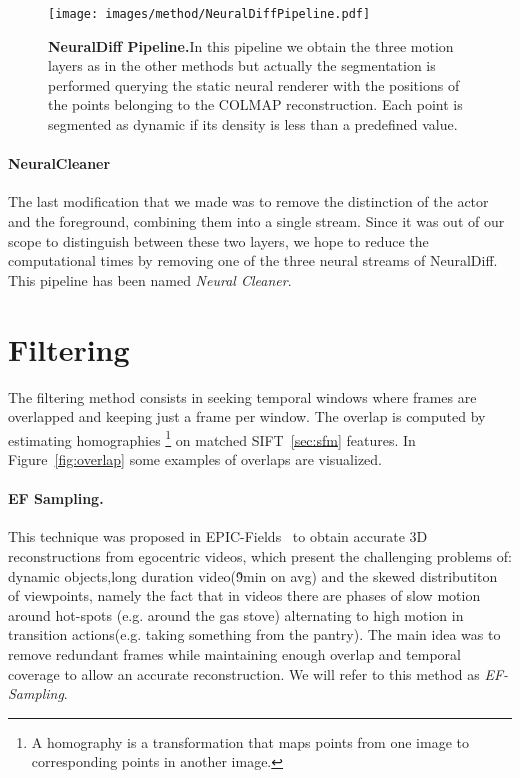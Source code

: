 \begin{figure}[t]
    \centering
    \texttt{[image: images/method/NeuralDiffPipeline.pdf]} 
    \caption{\textbf{NeuralDiff Pipeline.}In this pipeline we obtain the three motion layers as in the other methods
    but actually the segmentation is performed querying the static neural renderer with the positions
    of the points belonging to the COLMAP reconstruction. Each point is segmented as dynamic 
    if its density is less than a predefined value.}\label{fig:ndiffPipe}
\end{figure}

\paragraph{NeuralCleaner}The last modification that we made was to remove the distinction of the actor and the foreground, combining them into a single stream.
Since it was out of our scope to distinguish between these two layers, we hope to reduce the computational times by removing one of the
three neural streams of NeuralDiff. This pipeline has been named \textit{Neural Cleaner}.


\section{Filtering }\label{sec:sampl}
The filtering method consists 
in seeking temporal windows where frames are overlapped and keeping just
a frame per window. The overlap is computed by estimating homographies
\footnote{A homography is a transformation that maps points from one
 image to corresponding points in another image.
} on matched SIFT~\ref{sec:sfm} features. In Figure~\ref{fig:overlap} some examples 
of overlaps are visualized. 

\paragraph*{EF Sampling.}This technique was proposed in EPIC-Fields~\cite{epic_fields} to obtain accurate 3D reconstructions
from egocentric videos, which present the challenging problems of: dynamic objects,long duration video(\~9min on avg) and
the skewed distributiton of viewpoints, namely the fact that in videos there are phases of slow motion around 
hot-spots (e.g. around the gas stove) alternating to high motion in transition actions(e.g. taking something from the pantry).
The main idea was to remove redundant frames while maintaining enough overlap and temporal coverage to allow an accurate reconstruction.
We will refer to this method as \textit{EF-Sampling}.

